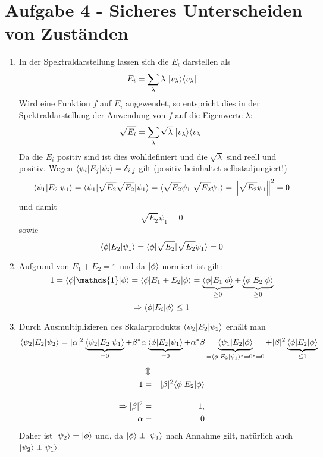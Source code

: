 \section*{Aufgabe 4 - Sicheres Unterscheiden von Zuständen}
\begin{enumerate}
        \item In der Spektraldarstellung lassen sich die $E_i$ darstellen als
                \[ E_i = \sum_{\lambda} \lambda\ |v_{\lambda} \rangle \langle v_\lambda| \]
              Wird eine Funktion $f$ auf $E_i$ angewendet, so entspricht dies
              in der Spektraldarstellung der Anwendung von $f$ auf die Eigenwerte $\lambda$:
                \[ \sqrt{E_i} = \sum_{\lambda} \sqrt{\lambda}\ |v_{\lambda}\ket \bra v_\lambda| \]
              Da die $E_i$ positiv sind ist dies wohldefiniert und die
              $\sqrt{\lambda}$ sind reell und positiv. Wegen $\langle \psi_i | E_j | \psi_i \rangle
              = \delta_{i,j}$ gilt (positiv beinhaltet selbstadjungiert!)
                \[ \langle \psi_1 | E_2 | \psi_1 \rangle = \langle \psi_1 | \sqrt{E_2}
                \sqrt{E_2} | \psi_1 \rangle = \langle \sqrt{E_2}\psi_1 | \sqrt{E_2}\psi_1 \rangle =
                \left\|\sqrt{E_2}\psi_1\right\|^2 = 0 \]
              und damit
                \[ \sqrt{E_2}\psi_1 = 0 \]
              sowie
                \[ \langle \phi | E_2 | \psi_1 \rangle = \langle \phi | \sqrt{E_2} | \sqrt{E_2}\psi_1 \rangle = 0 \]
        \item Aufgrund von $E_1 + E_2 = \mathds{1}$ und da $| \phi \rangle$ normiert ist gilt:
                \[ 1 = \bra \phi | \mathds{1}  | \phi \ket =
                \bra \phi | E_1+E_2 | \phi \ket = \underbrace{\bra \phi | E_1 | \phi \ket}_{\geq 0} +
                \underbrace{\bra \phi | E_2 | \phi \ket}_{\geq 0} \]
                \[ \Rightarrow \langle \phi | E_i | \phi \rangle \leq 1 \]
        \item Durch Ausmultiplizieren des Skalarprodukts $\langle \psi_2 | E_2 | \psi_2 \rangle$ erhält man
                \[ \langle\psi_2|E_2|\psi_2\rangle = |\alpha|^2
                \underbrace{\langle\psi_2|E_2|\psi_1\rangle}_{=0} + \beta^*\alpha
                \underbrace{\langle\phi|E_2|\psi_1\rangle}_{=0} + \alpha^*\beta
                \underbrace{\langle\psi_1|E_2|\phi\rangle}_{=\langle \phi| E_2 | \psi_1\rangle^* = 0^* = 0} + |\beta|^2
                \underbrace{\langle\phi|E_2|\phi\rangle}_{\leq 1} \]
                \begin{eqnarray*}
                 &\Updownarrow& \\
                1 &=& |\beta|^2 \langle\phi|E_2|\phi\rangle \\[1em]
                \Rightarrow |\beta|^2 &=& 1,\\\alpha &=& 0
                \end{eqnarray*}
        Daher ist $|\psi_2\rangle = |\phi\rangle$ und, da $|\phi\rangle \perp
        |\psi_1\rangle$ nach Annahme gilt, natürlich auch $|\psi_2\rangle \perp \psi_1\rangle$.
\end{enumerate}
